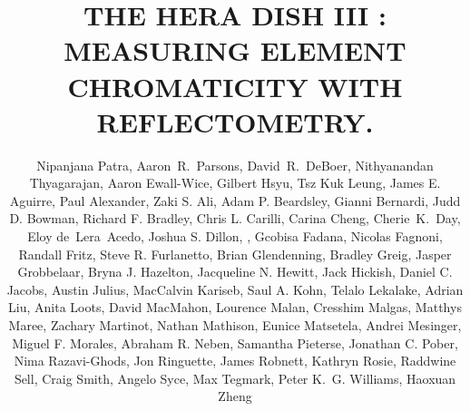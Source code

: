 \documentclass[twocolumn]{emulateapj}
\def\UCB{\altaffilmark{1}}
\def\ASU{\altaffilmark{2}}
\def\myemail{\altaffilmark{$\dagger$}}
\begin{document}
\title{THE HERA DISH III : MEASURING ELEMENT CHROMATICITY WITH REFLECTOMETRY. } 

\author{
Nipanjana Patra\UCB\myemail,
Aaron~R.~Parsons\UCB,
David~R.~DeBoer\UCB,
Nithyanandan Thyagarajan\ASU,
Aaron  Ewall-Wice,
Gilbert Hsyu\UCB, 
Tsz Kuk Leung\UCB,
James E. Aguirre, Paul  Alexander, Zaki S. Ali, Adam P. Beardsley, Gianni  Bernardi, Judd D. Bowman, Richard F. Bradley, Chris L. Carilli, Carina  Cheng, Cherie~K.~Day\UCB, Eloy  de~Lera~Acedo, Joshua S. Dillon, , Gcobisa  Fadana, Nicolas  Fagnoni, Randall  Fritz, Steve R. Furlanetto, Brian  Glendenning, Bradley  Greig, Jasper  Grobbelaar, Bryna J. Hazelton, Jacqueline N. Hewitt, Jack  Hickish, Daniel C. Jacobs, Austin  Julius, MacCalvin  Kariseb, Saul A. Kohn, Telalo  Lekalake, Adrian  Liu, Anita  Loots, David  MacMahon, Lourence  Malan, Cresshim  Malgas, Matthys  Maree, Zachary  Martinot, Nathan  Mathison, Eunice  Matsetela, Andrei  Mesinger, Miguel F. Morales, Abraham R. Neben,  Samantha  Pieterse, Jonathan C. Pober, Nima  Razavi-Ghods, Jon  Ringuette, James  Robnett, Kathryn  Rosie, Raddwine  Sell, Craig  Smith, Angelo  Syce, Max  Tegmark, Peter K.~G. Williams, Haoxuan  Zheng
}
\end{document}
